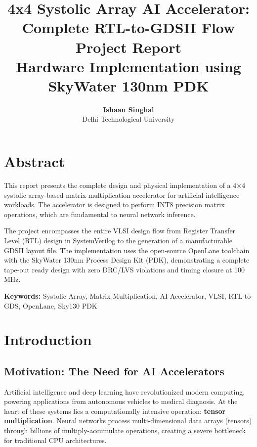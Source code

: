 \documentclass[12pt,a4paper]{article}
\title{
  \vspace{2cm}
  \textbf{\Huge 4x4 Systolic Array AI Accelerator: Complete RTL-to-GDSII Flow}\\
  \vspace{1cm}
  \Large{Project Report}\\
  \vspace{0.5cm}
  \large{Hardware Implementation using SkyWater 130nm PDK}\\
  \vspace{3cm}
}
\author{\textbf{Ishaan Singhal} \\ Delhi Technological University}
\date{}
\begin{document}
\maketitle
\thispagestyle{empty}












\newpage
\tableofcontents
\newpage

\section*{Abstract}

This report presents the complete design and physical implementation of a 4×4 systolic array-based matrix multiplication accelerator for artificial intelligence workloads. The accelerator is designed to perform INT8 precision matrix operations, which are fundamental to neural network inference. 

The project encompasses the entire VLSI design flow from Register Transfer Level (RTL) design in SystemVerilog to the generation of a manufacturable GDSII layout file. The implementation uses the open-source OpenLane toolchain with the SkyWater 130nm Process Design Kit (PDK), demonstrating a complete tape-out ready design with zero DRC/LVS violations and timing closure at 100 MHz.

\textbf{Keywords:} Systolic Array, Matrix Multiplication, AI Accelerator, VLSI, RTL-to-GDS, OpenLane, Sky130 PDK

\newpage

\section{Introduction}

\subsection{Motivation: The Need for AI Accelerators}

Artificial intelligence and deep learning have revolutionized modern computing, powering applications from autonomous vehicles to medical diagnosis. At the heart of these systems lies a computationally intensive operation: \textbf{tensor multiplication}. Neural networks process multi-dimensional data arrays (tensors) through billions of multiply-accumulate operations, creating a severe bottleneck for traditional CPU architectures.
\end{document}
